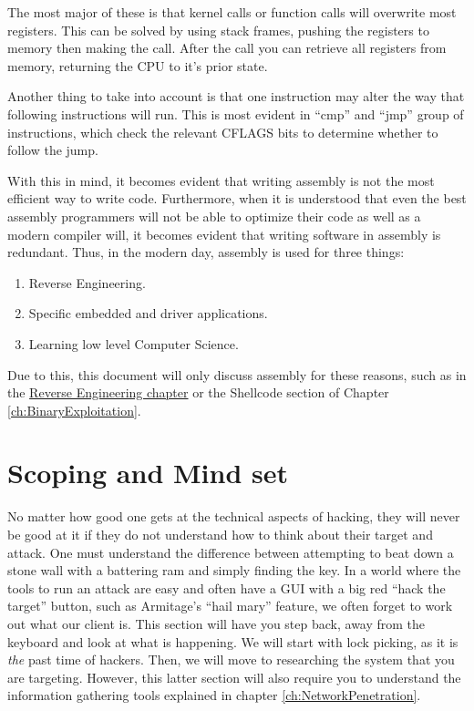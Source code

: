 \documentclass[a4paper,11pt]{report}
\begin{document}
			The most major of these is that kernel calls or function calls will overwrite most registers. 
			This can be solved by using stack frames, pushing the registers to memory then making the call. 
			After the call you can retrieve all registers from memory, returning the CPU to it's prior state. 

			Another thing to take into account is that one instruction may alter the way that following instructions will run. 
			This is most evident in ``cmp'' and ``jmp'' group of instructions, which check the relevant CFLAGS bits to determine whether to follow the jump. 

			With this in mind, it becomes evident that writing assembly is not the most efficient way to write code. 
			Furthermore, when it is understood that even the best assembly programmers will not be able to optimize their code as well as a modern compiler will, it becomes evident that writing software in assembly is redundant. 
			Thus, in the modern day, assembly is used for three things:
			\begin{enumerate}
				\item Reverse Engineering.
				\item Specific embedded and driver applications.
				\item Learning low level Computer Science. 
			\end{enumerate}
			
			Due to this, this document will only discuss assembly for these reasons, such as in the \hyperref[ch:ReverseEngineering]{Reverse Engineering chapter} or the Shellcode section of Chapter \ref{ch:BinaryExploitation}.
			
\chapter{Scoping and Mind set}
	\label{ch:ScopingMindset}
		No matter how good one gets at the technical aspects of hacking, they will never be good at it if they do not understand how to think about their target and attack. 
		One must understand the difference between attempting to beat down a stone wall with a battering ram and simply finding the key. 
		In a world where the tools to run an attack are easy and often have a GUI with a big red ``hack the target'' button, such as Armitage's ``hail mary'' feature, 
		we often forget to work out what our client is. 
		This section will have you step back, away from the keyboard and look at what is happening. 
		We will start with lock picking, as it is \emph{the} past time of hackers. 
		Then, we will move to researching the system that you are targeting. 
		However, this latter section will also require you to understand the information gathering tools explained in chapter \ref{ch:NetworkPenetration}.
\end{document}
